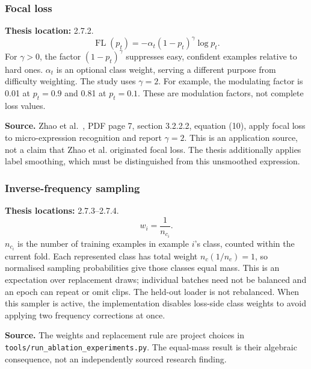\documentclass[11pt,a4paper]{article}
\numberwithin{equation}{section}
\begin{document}
\subsubsection{Focal loss}
\label{fg:focal}
\textbf{Thesis location:} 2.7.2.
\begin{equation}
    \operatorname{FL}(p_t)=-\alpha_t(1-p_t)^\gamma\log p_t.
    \label{fg:eq:focal}
\end{equation}
For $\gamma>0$, the factor $(1-p_t)^\gamma$ suppresses easy, confident examples
relative to hard ones. $\alpha_t$ is an optional class weight, serving a
different purpose from difficulty weighting. The study uses $\gamma=2$.
For example, the modulating factor is 0.01 at $p_t=0.9$ and 0.81 at $p_t=0.1$.
These are modulation factors, not complete loss values.

\textbf{Source.} Zhao et al.~\cite{zhaoS2021}, PDF page 7, section 3.2.2.2,
equation (10), apply focal loss to micro-expression recognition and report
$\gamma=2$. This is an application source, not a claim that Zhao et al.
originated focal loss. The thesis additionally applies label smoothing,
which must be distinguished from this unsmoothed expression.

\subsubsection{Inverse-frequency sampling}
\label{fg:sampling}
\textbf{Thesis locations:} 2.7.3--2.7.4.
\begin{equation}
    w_i=\frac1{n_{c_i}}.
    \label{fg:eq:sampling}
\end{equation}
$n_{c_i}$ is the number of training examples in example $i$'s class, counted
within the current fold. Each represented class has total weight
$n_c(1/n_c)=1$, so normalised sampling probabilities give those classes
equal mass. This is an expectation over replacement draws; individual
batches need not be balanced and an epoch can repeat or omit clips.
The held-out loader is not rebalanced. When this sampler is active, the
implementation disables loss-side class weights to avoid applying two
frequency corrections at once.

\textbf{Source.} The weights and replacement rule are project choices in
\texttt{tools/run\_ablation\_experiments.py}. The equal-mass result is their
algebraic consequence, not an independently sourced research finding.
\end{document}
